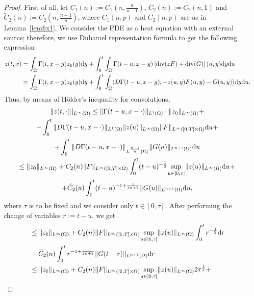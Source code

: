 \documentclass[10pt,a4paper,nouppercase,nowrite]{article}
\numberwithin{equation}{section}
\newcommand{\di}{{\rm d}}
\theoremstyle{definition}
\begin{document}
	\begin{proof}
		First of all, let $C_1(n):=C_1(n,\frac{n}{n-1})$, $C_2(n):=C_2(n,1)$ and $\tilde C_2(n):=C_2(n,\frac{n+1}{n})$, where $C_1(n,p)$ and $C_2(n,p)$ are as in Lemma~\ref{lemfix1}. We consider the PDE as a heat equation with an external source; therefore, we use Duhamel representation formula to get the following expression
		\begin{equation*}
			\begin{split}
			z(t,x)&=\int_{\Omega} \Gamma(t,x-y)z_0(y) \di y + \int_0^t \int_{\Omega} \Gamma(t-u,x-y) \left[ \text{div}(zF) + \text{div}(G) \right](u,y) \di y \di u \\
			&=\int_{\Omega} \Gamma(t,x-y)z_0(y) \di y + \int_0^t \int_{\Omega} \langle D\Gamma(t-u,x-y), -z(u,y)F(u,y) - G(u,y) \rangle \di y \di u.
			\end{split}
		\end{equation*}
		Thus, by means of Hölder's inequality for convolutions,
		\begin{multline*}
			\| z(t,\cdot) \|_{L^{\infty}(\Omega)} \le \| \Gamma(t-u,x-\cdot) \|_{L^1(\Omega)} \cdot \| z_0 \|_{L^{\infty}(\Omega)} +\\ + \int_0^t \| D\Gamma(t-u,x-\cdot) \|_{L^1(\Omega)} \| z(u) \|_{L^{\infty}(\Omega)} \| F \|_{L^{\infty}([0,T] \times \Omega)} \di u
			+\\ + \int_0^t \| D\Gamma(t-u,x-\cdot) \|_{L^{\frac{n+1}{n}}(\Omega)} \| G(u) \|_{L^{n+1}(\Omega)} \di u \\
			\le \| z_0 \|_{L^{\infty}(\Omega)} +  C_2(n) \| F \|_{L^{\infty}([0,T] \times \Omega)}  \int_0^t (t-u)^{-\frac{1}{2}} \underset{u \in [0,\tau]}{\sup} \| z(u) \|_{L^{\infty}(\Omega)} \di u
			+ \\ +\tilde C_2(n) \int_0^t (t-u)^{-1+\frac{1}{2n+2}} \| G(u) \|_{L^{n+1}(\Omega)} \di u,
		\end{multline*}
		where $\tau$ is to be fixed and we consider only $t \in [0,\tau]$.
		After performing the change of variables $r:=t-u$, we get
		\begin{equation*}
			\begin{split}
			&\le \| z_0 \|_{L^{\infty}(\Omega)} + C_2(n)  \| F \|_{L^{\infty}([0,T] \times \Omega)}  \underset{u \in [0,\tau]}{\sup} \| z(u) \|_{L^{\infty}(\Omega)} \int_0^t r^{-\frac{1}{2}} \di r \\
			&+\tilde C_2(n) \int_0^t r^{-1+\frac{1}{2n+2}} \| G(t-r) \|_{L^{n+1}(\Omega)} \di r \\
			&\le \| z_0 \|_{L^{\infty}(\Omega)} + C_2(n) \| F \|_{L^{\infty}([0,T] \times \Omega)}  \underset{u \in [0,\tau]}{\sup} \| z(u) \|_{L^{\infty}(\Omega)} 2\tau^{\frac{1}{2}} + \\

\end{split}
\end{equation*}
\end{proof}
\end{document}
